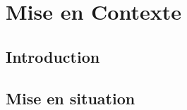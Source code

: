 \documentclass[DIV=15,paper=letter,titlepage=true,fontsize=12pt,headings=normal,captions=nooneline]{scrartcl}
\begin{document}

\newpage
\renewcommand*\contentsname{Table des Matières}
\tableofcontents
\newpage

\setcounter{page}{0}

 \section{Mise en Contexte} %
 \subsection{Introduction}
 
 \subsection{Mise en situation}
 
% 
% 
% 
% 
% 
\end{document}
